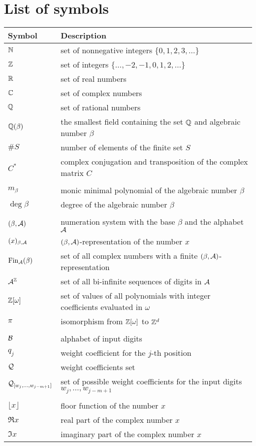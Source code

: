 \chapter*{List of symbols}
\begin{tabular}{ll}
Symbol        & Description \\ \hline
$\mathbb{N}$         & set of nonnegative integers $\{0,1,2,3,\dots\}$   \\
$\mathbb{Z}$         & set of integers $\{\dots,-2,-1,0,1,2,\dots\}$ \\
$\mathbb{R}$           & set of real numbers \\
$\mathbb{C}$           & set of complex numbers \\
$\mathbb{Q}$           &set of rational numbers \\
$\mathbb{Q}(\beta)$    &the smallest field containing the set $\mathbb{Q}$ and algebraic number  $\beta$ \\
$\#S$          & number of elements of the finite set $S$ \\
$C^*$            & complex conjugation and transposition of the complex matrix $C$ \\
\rule{0cm}{0cm}& \\
$m_\beta$       &monic minimal polynomial of the algebraic number $\beta$ \\
$\deg \beta$    &degree of the algebraic number $\beta$ \\
\rule{0cm}{0cm}& \\
$(\beta,\mathcal{A})$            & numeration system with the base $\beta$ and the alphabet $\mathcal{A}$\\
$(x)_{\beta,\mathcal{A}}$    &$(\beta,\mathcal{A})$-representation of the number $x$\\
$\text{Fin}_{\mathcal{A}}(\beta)$          &set of all complex numbers with a finite $(\beta,\mathcal{A})$-representation \\
$\mathcal{A}^{\mathbb{Z}}$        &set of all bi-infinite sequences of digits in $\mathcal{A}$\\
$\mathbb{Z}[\omega]$       &set of values of all polynomials with integer coefficients evaluated in $\omega$\\
$\pi$           &isomorphism from $\mathbb{Z}[\omega]$ to $\mathbb{Z}^d$ \\
\rule{0cm}{0cm}& \\
$\mathcal{B}$            &alphabet of input digits\\
$q_j$           &weight coefficient for the $j$-th position \\
$\mathcal{Q}$            &weight coefficients set\\
$\mathcal{Q}_{[w_{j},\dots, w_{j-m+1}]}$ &set of possible weight coefficients for the input digits $w_{j},\dots, w_{j-m+1}$ \\
\rule{0cm}{0cm}& \\
$\lfloor x \rfloor$ & floor function of the number $x$ \\  
$\Re x$           & real part of the complex number $x$ \\
$\Im x$           & imaginary part of the complex number $x$
\end{tabular}